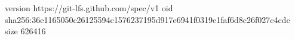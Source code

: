 version https://git-lfs.github.com/spec/v1
oid sha256:36e1165050c26125594c1576237195d917e6941f0319e1faf6d8c26f027c4cdc
size 626416
